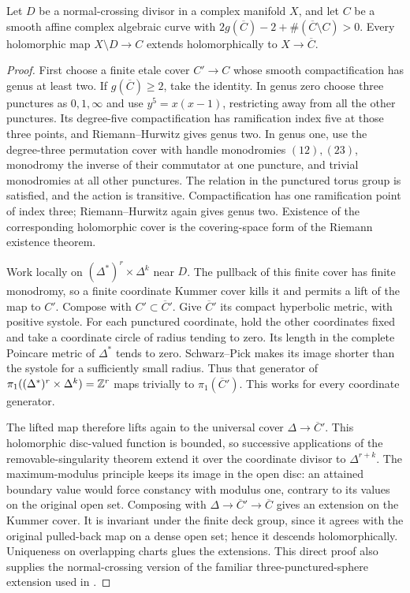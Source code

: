 \begin{lemma}\label{P3a-Picard}
Let $D$ be a normal-crossing divisor in a complex manifold $X$,
and let $C$ be a smooth affine complex algebraic curve with
$2g(\overline C)-2+\#(\overline C\setminus C)>0$. Every holomorphic
map $X\setminus D\to C$ extends holomorphically to $X\to\overline C$.
\end{lemma}
\begin{proof}
First choose a finite etale cover $C'\to C$ whose smooth compactification
has genus at least two. If $g(\overline C)\geq2$, take the identity.
In genus zero choose three punctures as $0,1,\infty$ and use
$y^5=x(x-1)$, restricting away from all the other punctures. Its
degree-five compactification has ramification index five at those
three points, and Riemann--Hurwitz gives genus two. In genus one,
use the degree-three permutation cover with handle monodromies
$(12),(23)$, monodromy the inverse of their commutator at one
puncture, and trivial monodromies at all other punctures. The
relation in the punctured torus group is satisfied, and the action
is transitive. Compactification has one ramification point of
index three; Riemann--Hurwitz again gives genus two. Existence of
the corresponding holomorphic cover is the covering-space form
of the Riemann existence theorem.

Work locally on $(\Delta^*)^r\times\Delta^k$ near $D$. The pullback
of this finite cover has finite monodromy, so a finite coordinate
Kummer cover kills it and permits a lift of the map to $C'$.
Compose with $C'\subset\overline C'$. Give $\overline C'$ its
compact hyperbolic metric, with positive systole. For each
punctured coordinate, hold the other coordinates fixed and take
a coordinate circle of radius tending to zero. Its length in
the complete Poincare metric of $\Delta^*$ tends to zero.
Schwarz--Pick makes its image shorter than the systole for a
sufficiently small radius. Thus that generator of
$\pi _1((\Delta^*)^r\times\Delta^k)=\mathbb Z^r$ maps trivially to
$\pi _1(\overline C')$. This works for every coordinate generator.

The lifted map therefore lifts again to the universal cover
$\Delta\to\overline C'$. This holomorphic disc-valued function is
bounded, so successive applications of the removable-singularity
theorem extend it over the coordinate divisor to $\Delta^{r+k}$.
The maximum-modulus principle keeps its image in the open disc:
an attained boundary value would force constancy with modulus one,
contrary to its values on the original open set. Composing with
$\Delta\to\overline C'\to\overline C$ gives an extension on the
Kummer cover. It is invariant under the finite deck group, since
it agrees with the original pulled-back map on a dense open set;
hence it descends holomorphically. Uniqueness on overlapping
charts glues the extensions. This direct proof also supplies the
normal-crossing version of the familiar three-punctured-sphere
extension used in \citet[p.~213]{KiernanKobayashi1973}.
\end{proof}

